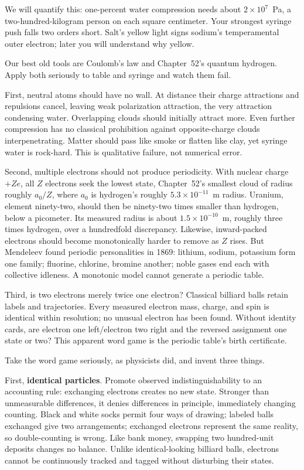 We will quantify this: one-percent water compression needs about \(2\times10^{7}\)~Pa, a two-hundred-kilogram person on each square centimeter. Your strongest syringe push falls two orders short. Salt's yellow light signs sodium's temperamental outer electron; later you will understand why yellow.


Our best old tools are Coulomb's law and Chapter~52's quantum hydrogen. Apply both seriously to table and syringe and watch them fail.

First, neutral atoms should have no wall. At distance their charge attractions and repulsions cancel, leaving weak polarization attraction, the very attraction condensing water. Overlapping clouds should initially attract more. Even further compression has no classical prohibition against opposite-charge clouds interpenetrating. Matter should pass like smoke or flatten like clay, yet syringe water is rock-hard. This is qualitative failure, not numerical error.

Second, multiple electrons should not produce periodicity. With nuclear charge \(+Ze\), all \(Z\) electrons seek the lowest state, Chapter~52's smallest cloud of radius roughly \(a_0/Z\), where \(a_0\) is hydrogen's roughly \(5.3\times10^{-11}\)~m radius. Uranium, element ninety-two, should then be ninety-two times smaller than hydrogen, below a picometer. Its measured radius is about \(1.5\times10^{-10}\)~m, roughly three times hydrogen, over a hundredfold discrepancy. Likewise, inward-packed electrons should become monotonically harder to remove as \(Z\) rises. But Mendeleev found periodic personalities in 1869: lithium, sodium, potassium form one family; fluorine, chlorine, bromine another; noble gases end each with collective idleness. A monotonic model cannot generate a periodic table.

Third, is two electrons merely twice one electron? Classical billiard balls retain labels and trajectories. Every measured electron mass, charge, and spin is identical within resolution; no unusual electron has been found. Without identity cards, are electron one left/electron two right and the reversed assignment one state or two? This apparent word game is the periodic table's birth certificate.


Take the word game seriously, as physicists did, and invent three things.

First, \textbf{identical particles}. Promote observed indistinguishability to an accounting rule: exchanging electrons creates no new state. Stronger than unmeasurable differences, it denies differences in principle, immediately changing counting. Black and white socks permit four ways of drawing; labeled balls exchanged give two arrangements; exchanged electrons represent the same reality, so double-counting is wrong. Like bank money, swapping two hundred-unit deposits changes no balance. Unlike identical-looking billiard balls, electrons cannot be continuously tracked and tagged without disturbing their states.

